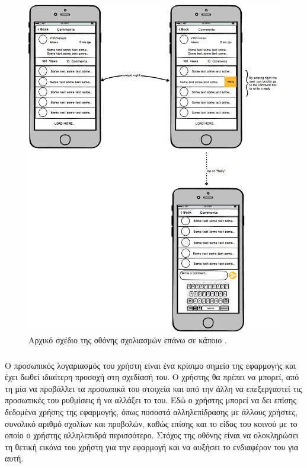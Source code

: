 \begin{figure}[H]
    \centering
    \includegraphics[scale=0.25]{figures/comments.png}
    \caption{Αρχικό σχέδιο της οθόνης σχολιασμών επάνω σε κάποιο .}
    \label{commentmockup}
\end{figure}



\subsubsection{}
Ο προσωπικός λογαριασμός του χρήστη είναι ένα κρίσιμο σημείο της εφαρμογής και έχει δωθεί ιδιαίτερη προσοχή στη σχεδίασή του. Ο χρήστης θα πρέπει να μπορεί, από τη μία να προβάλλει τα προσωπικά του στοιχεία και από την άλλη να επεξεργαστεί τις προσωπικές του ρυθμίσεις ή να αλλάξει το  του. Εδώ ο χρήστης μπορεί να δει επίσης δεδομένα χρήσης της εφαρμογής, όπως ποσοστά αλληλεπίδρασης με άλλους χρήστες, συνολικό αριθμό σχολίων και προβολών, καθώς επίσης και το είδος του κοινού με το οποίο ο χρήστης αλληλεπιδρά περισσότερο. Στόχος της οθόνης  είναι να ολοκληρώσει τη θετική εικόνα του χρήστη για την εφαρμογή και να αυξήσει το ενδιαφέρον του για αυτή.

